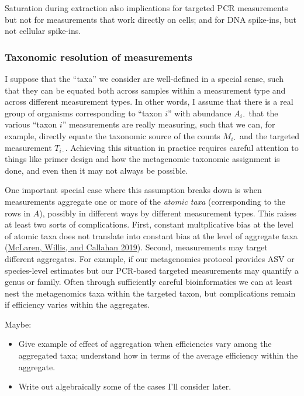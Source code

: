 \documentclass[
]{article}
\providecommand{\tightlist}{%
  \setlength{\itemsep}{0pt}\setlength{\parskip}{0pt}}
\theoremstyle{definition}
\theoremstyle{definition}
\theoremstyle{definition}
\theoremstyle{definition}
\theoremstyle{remark}
\begin{document}
Saturation during extraction also implications for targeted PCR measurements but not for measurements that work directly on cells; and for DNA spike-ins, but not cellular spike-ins.

\hypertarget{taxonomic-resolution-of-measurements}{%
\subsubsection{Taxonomic resolution of measurements}\label{taxonomic-resolution-of-measurements}}

I suppose that the ``taxa'' we consider are well-defined in a special sense, such that they can be equated both across samples within a measurement type and across different measurement types.
In other words, I assume that there is a real group of organisms corresponding to ``taxon \(i\)'' with abundance \(A_{i\cdot}\) that the various ``taxon \(i\)'' measurements are really measuring, such that we can, for example, directly equate the taxonomic source of the counts \(M_{i\cdot}\) and the targeted measurement \(T_{i\cdot}\).
Achieving this situation in practice requires careful attention to things like primer design and how the metagenomic taxonomic assignment is done, and even then it may not always be possible.

One important special case where this assumption breaks down is when measurements aggregate one or more of the \emph{atomic taxa} (corresponding to the rows in \(A\)), possibly in different ways by different measurement types.
This raises at least two sorts of complications.
First, constant multplicative bias at the level of atomic taxa does not translate into constant bias at the level of aggregate taxa (\protect\hyperlink{ref-mclaren2019cons}{McLaren, Willis, and Callahan 2019}).
Second, measurements may target different aggregates.
For example, if our metagenomics protocol provides ASV or species-level estimates but our PCR-based targeted measurements may quantify a genus or family.
Often through sufficiently careful bioinformatics we can at least nest the metagenomics taxa within the targeted taxon, but complications remain if efficiency varies within the aggregates.

Maybe:

\begin{itemize}
\tightlist
\item
  Give example of effect of aggregation when efficiencies vary among the aggregated taxa; understand how in terms of the average efficiency within the aggregate.
\item
  Write out algebraically some of the cases I'll consider later.
\end{itemize}
\end{document}
